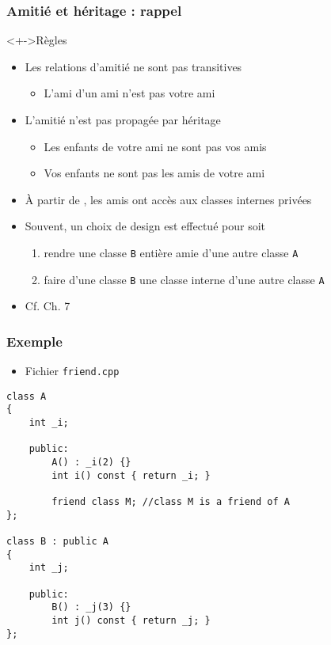 \begin{frame}
\frametitle{Amitié et héritage : rappel}
\begin{alertblock}<+->{Règles}
\begin{itemize}[<+->]
\item Les relations d'amitié ne sont pas transitives
	\begin{itemize}
	\item L'ami d'un ami n'est pas votre ami
	\end{itemize}
\item L'amitié n'est pas propagée par héritage
	\begin{itemize}
	\item Les enfants de votre ami ne sont pas vos amis	
	\item Vos enfants ne sont pas les amis de votre ami
	\end{itemize}
\item À partir de , les amis ont accès aux classes internes privées
\end{itemize}
\end{alertblock}
\begin{itemize}[<+->]
\item Souvent, un choix de design est effectué pour soit
	\begin{enumerate}
	\item rendre une classe \texttt{B} entière amie d'une autre classe \texttt{A}
	\item faire d'une classe \texttt{B} une classe interne d'une autre classe \texttt{A}
	\end{enumerate}
\item Cf. Ch. 7
\end{itemize}
\end{frame}

\begin{frame}[containsverbatim]
\frametitle{Exemple}
\begin{itemize}
\item Fichier \texttt{friend.cpp}
\end{itemize}
\begin{lstlisting}
class A
{
	int _i;
	
	public:
		A() : _i(2) {}
		int i() const { return _i; }

		friend class M; //class M is a friend of A
};

class B : public A
{
	int _j;
	
	public:
		B() : _j(3) {}
		int j() const { return _j; }
};
\end{lstlisting}
\end{frame}

